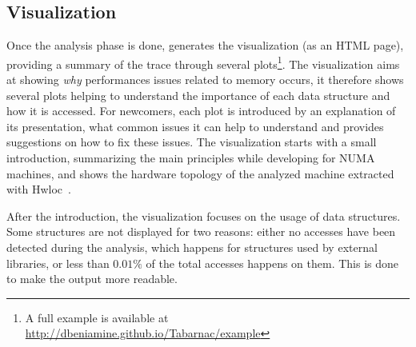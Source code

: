 



\subsection{Visualization}
\label{sec:design-visu}


Once the analysis phase is done,
\TABARNAC generates the visualization (as an HTML page), providing a summary
of the trace through several plots\footnote{A full example is available at
    \url{http://dbeniamine.github.io/Tabarnac/example}}.
The visualization aims at showing \emph{why} performances issues related
to memory occurs, it therefore shows several plots helping to understand the
importance of each data structure and how it is accessed.
For newcomers, each plot is introduced by an explanation
of its presentation, what common issues it can help to understand and provides
suggestions on how to fix these issues.  The visualization starts with a small
introduction, summarizing the main principles while developing for NUMA
machines, and shows the hardware topology of the analyzed machine extracted
with Hwloc~\cite{Broquedis10hwloc}.

After the introduction, the visualization focuses on the usage of data structures. Some
structures are not displayed for two reasons: either no accesses have been
detected during the analysis, which happens for structures used by external
libraries, or less than $0.01\%$ of the total accesses happens on them. This is
done to make the output more readable.

